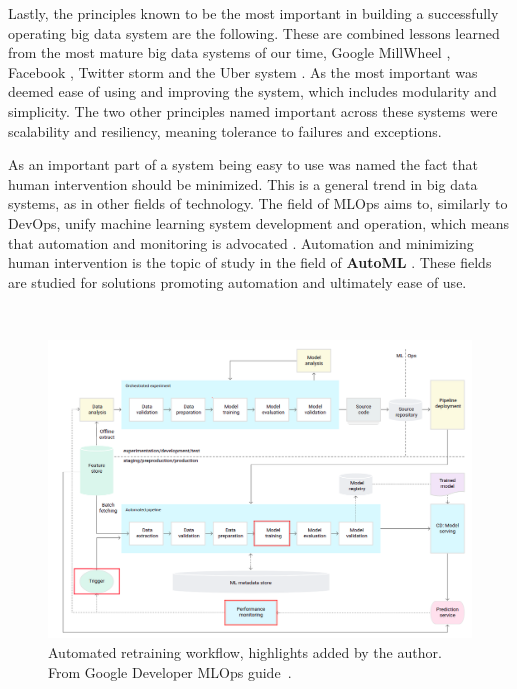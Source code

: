 Lastly, the principles known to be the most important in building a successfully operating big data system are the following. These are combined lessons learned from the most mature big data systems of our time, Google MillWheel \cite{millwheel}, Facebook \cite{facebook}, Twitter storm \cite{storm@twitter} and the Uber system \cite{uber}. As the most important was deemed ease of using and improving the system, which includes modularity and simplicity. The two other principles named important across these systems were scalability and resiliency, meaning tolerance to failures and exceptions. 

As an important part of a system being easy to use was named the fact that human intervention should be minimized. This is a general trend in big data systems, as in other fields of technology. The field of MLOps aims to, similarly to DevOps, unify machine learning system development and operation, which means that automation and monitoring is advocated \cite{googlemlops}. Automation and minimizing human intervention is the topic of study in the field of \textbf{AutoML} \cite{celikAdaptationStrategiesAutomated2021}. These fields are studied for solutions promoting automation and ultimately ease of use.

\begin{figure}[ht]
\ \newline
\begin{center}
\includegraphics[width=1.0\columnwidth]{triggergooglemarked.png}
\caption{Automated retraining workflow, highlights added by the author. From Google Developer MLOps guide~\cite{googlemlops}.}
\label{triggerpipeline}
\end{center}
\end{figure}

